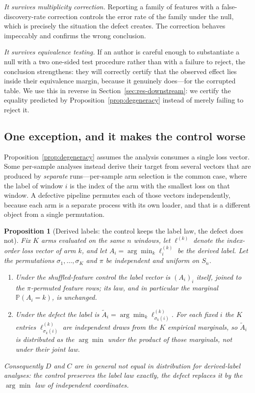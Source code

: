 \documentclass[a4paper,fleqn]{cas-sc}
\newtheorem{proposition}{Proposition}
\begin{document}
\emph{It survives multiplicity correction.} Reporting a family of features with a
false-discovery-rate correction \citep{benjamini1995} controls the error rate of
the family under the null, which is precisely the situation the defect creates.
The correction behaves impeccably and confirms the wrong conclusion.

\emph{It survives equivalence testing.} If an author is careful enough to
substantiate a null with a two one-sided test procedure
\citep{schuirmann1987,lakens2017} rather than with a failure to reject, the
conclusion strengthens: they will correctly certify that the observed effect lies
inside their equivalence margin, because it genuinely does---for the corrupted
table. We use this in reverse in Section~\ref{sec:res-downstream}: we certify the
equality predicted by Proposition~\ref{prop:degeneracy} instead of merely failing
to reject it.

\subsection{One exception, and it makes the control worse}
\label{sec:derived}

Proposition~\ref{prop:degeneracy} assumes the analysis consumes a single loss
vector. Some per-sample analyses instead derive their target from several vectors
that are produced by \emph{separate} runs---per-sample arm selection is the common
case, where the label of window $i$ is the index of the arm with the smallest loss
on that window. A defective pipeline permutes each of those vectors independently,
because each arm is a separate process with its own loader, and that is a different
object from a single permutation.

\begin{proposition}[Derived labels: the control keeps the label law, the defect does
not]
\label{prop:derived}
Fix $K$ arms evaluated on the same $n$ windows, let $\ell^{(k)}$ denote the
index-order loss vector of arm $k$, and let $A_i = \arg\min_k \ell^{(k)}_i$ be the
derived label. Let the permutations $\sigma_1,\dots,\sigma_K$ and $\pi$ be
independent and uniform on $S_n$.
\begin{enumerate}
\item Under the shuffled-feature control the label vector is $(A_i)_i$ itself,
      joined to the $\pi$-permuted feature rows; its law, and in particular the
      marginal $\mathbb{P}(A_i = k)$, is unchanged.
\item Under the defect the label is
      $\tilde{A}_i = \arg\min_k \ell^{(k)}_{\sigma_k(i)}$. For each fixed $i$ the
      $K$ entries $\ell^{(k)}_{\sigma_k(i)}$ are independent draws from the $K$
      empirical marginals, so $\tilde{A}_i$ is distributed as the $\arg\min$ under
      the \emph{product} of those marginals, not under their joint law.
\end{enumerate}
Consequently $D$ and $C$ are in general \emph{not} equal in distribution for
derived-label analyses: the control preserves the label law exactly, the defect
replaces it by the $\arg\min$ law of independent coordinates.
\end{proposition}
\end{document}
